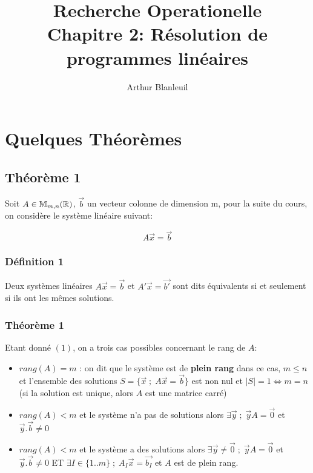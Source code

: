 \documentclass[a4paper, 11pt]{article}
\begin{document}
\title{Recherche Operationelle\\Chapitre 2: Résolution de programmes linéaires}
\author{Arthur Blanleuil}

\maketitle

\section{Quelques Théorèmes}

\subsection{Théorème 1}

Soit $A \in \mathbb{M}_{m,n}(\mathbb{R})$, $\vec{b}$ un vecteur colonne de dimension m, pour la suite du cours, on considère le système linéaire suivant:

\begin{equation}A\vec{x} = \vec{b}\end{equation}

\subsubsection{Définition 1}

Deux systèmes linéaires $A\vec{x} = \vec{b}$ et $A'\vec{x} = \vec{b'}$ sont dits équivalents si et seulement si ils ont les mêmes solutions.

\subsubsection{Théorème 1}

Etant donné $(1)$, on a trois cas possibles concernant le rang de $A$:

\begin{itemize}
  \item $rang(A) = m$ : on dit que le système est de \textbf{plein rang}
    dans ce cas, $m \le n$ et l'ensemble des solutions $S = \{ \vec{x} \; ; \; A\vec{x} = \vec{b} \}$ est non nul
    et $|S| = 1 \Leftrightarrow m = n$ (si la solution est unique, alors $A$ est une matrice carré)
  \item $rang(A) < m$ et le système n'a pas de solutions alors $\exists \vec{y} \; ; \; \vec{y}A = \vec{0}$ et $\vec{y} . \vec{b} \ne 0$
  \item $rang(A) < m$ et le système a des solutions alors $\exists \vec{y} \ne \vec{0} \; ; \; \vec{y}A = \vec{0}$ et $\vec{y} . \vec{b} \ne 0$
    ET $\exists I \in \{ 1 .. m \} \; ; \; A_I\vec{x} = \vec{b_I}$ et $A$ est de plein rang.
\end{itemize}
\end{document}
